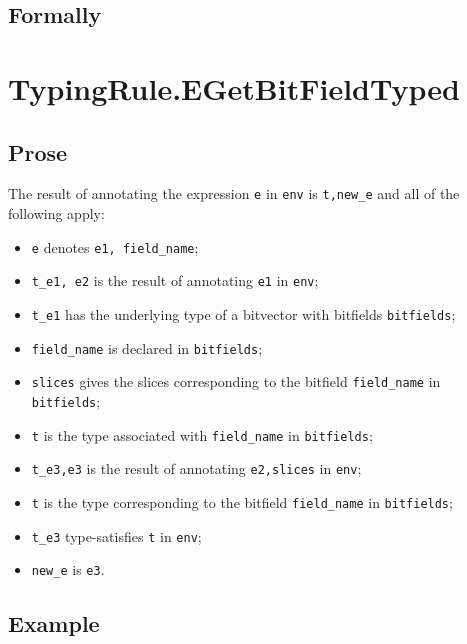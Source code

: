 \documentclass{book}
\begin{document}
\begin{itemize}
\begin{emptyformal}
    \subsection{Formally}
\end{emptyformal}


\section{TypingRule.EGetBitFieldTyped \label{sec:TypingRule.EGetBitFieldTyped}}

  \subsection{Prose}
  The result of annotating the expression \texttt{e} in \texttt{env} is
\texttt{t,new\_e} and all of the following apply:
  \begin{itemize}
  \item \texttt{e} denotes \texttt{e1, field\_name};
  \item \texttt{t\_e1, e2} is the result of annotating \texttt{e1} in \texttt{env};
  \item \texttt{t\_e1} has the underlying type of a bitvector with bitfields \texttt{bitfields};
  \item \texttt{field\_name} is declared in \texttt{bitfields};
  \item \texttt{slices} gives the slices corresponding to the bitfield \texttt{field\_name} in \\
    \texttt{bitfields};
  \item \texttt{t} is the type associated with \texttt{field\_name} in \texttt{bitfields};
  \item \texttt{t\_e3,e3} is the result of annotating \texttt{e2,slices} in \texttt{env};
  \item \texttt{t} is the type corresponding to the bitfield \texttt{field\_name} in \texttt{bitfields};
  \item \texttt{t\_e3} type-satisfies \texttt{t} in \texttt{env};
  \item \texttt{new\_e} is \texttt{e3}.
  \end{itemize}

  \subsection{Example}



\end{itemize}
\end{document}
